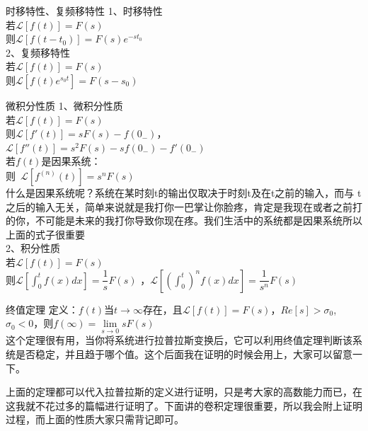 \documentclass[UTF8,a4paper,12pt]{ctexart}
\begin{document}
   \begin{titlebox}{时移特性、复频移特性}
    1、时移特性
    \\若$\mathcal{L}\left[ f\left( t \right) \right] =F(s)$
    \\则$\mathcal{L}\left[ f\left( t-t_0 \right) \right] =F(s)e^{-st_0}$
    \\2、复频移特性
    \\若$\mathcal{L}\left[ f\left( t \right) \right] =F(s)$
    \\则$\mathcal{L}\left[ f\left( t \right)e^{s_0t} \right] =F(s-s_0)$
   \end{titlebox}
   \begin{titlebox}{微积分性质}
    1、微积分性质
   \\若$\mathcal{L}\left[ f\left( t \right) \right] =F(s)$
   \\则$\mathcal{L}\left[ f'\left( t \right) \right] =sF(s)-f(0_-)$，$\mathcal{L}\left[ f''\left( t \right) \right] =s^2F(s)-sf(0_-)-f'(0_-)$
   \\若$f(t)$是因果系统：
   \\则\ $\mathcal{L}\left[ f^{(n)}(t) \right] =s^nF(s)$
   \\{\scriptsize 什么是因果系统呢？系统在某时刻t的输出仅取决于时刻t及在t之前的输入，而与 t之后的输入无关，简单来说就是我打你一巴掌让你脸疼，肯定是我现在或者之前打的你，不可能是未来的我打你导致你现在疼。我们生活中的系统都是因果系统所以上面的式子很重要}
   \\2、积分性质
   \\若$\mathcal{L}\left[ f\left( t \right) \right] =F(s)$
   \\则$\mathcal{L}[\int_0^t{f(x)}dx] =\dfrac{1}{s}F(s)$
   ，$\mathcal{L}[(\int_0^t)^n{f(x)}dx] =\dfrac{1}{s^n}F(s)$
   \end{titlebox}
   \begin{titlebox}{终值定理}
    定义：$f(t)$当$t\rightarrow\infty$存在，且$\mathcal{L}\left[ f\left( t \right) \right] =F(s)$，$Re[s]>\sigma_0$,$\sigma_0<0$，则$f(\infty)=\underset{s\rightarrow 0}{\lim}sF\left( s \right) $
    \\{\scriptsize 这个定理很有用，当你将系统进行拉普拉斯变换后，它可以利用终值定理判断该系统是否稳定，并且趋于哪个值。这个后面我在证明的时候会用上，大家可以留意一下。}
   \end{titlebox}
   \begin{flushleft}
    上面的定理都可以代入拉普拉斯的定义进行证明，只是考大家的高数能力而已，在这我就不花过多的篇幅进行证明了。下面讲的卷积定理很重要，所以我会附上证明过程，而上面的性质大家只需背记即可。
   \end{flushleft}
\end{document}
